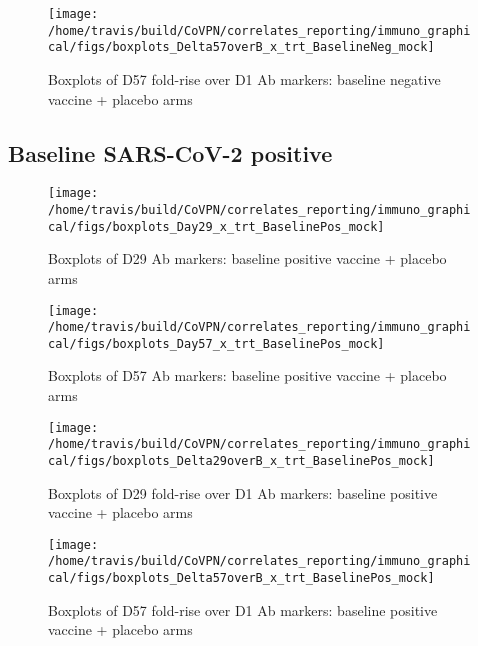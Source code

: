 \documentclass[]{book}
\theoremstyle{definition}
\theoremstyle{definition}
\theoremstyle{definition}
\newcommand{\1}{\mathbbm{1}}
\begin{document}
\begin{figure}[H]

{\centering \texttt{[image: /home/travis/build/CoVPN/correlates\_reporting/immuno\_graphical/figs/boxplots\_Delta57overB\_x\_trt\_BaselineNeg\_mock]} 

}

\caption{Boxplots of D57 fold-rise over D1 Ab markers: baseline negative vaccine + placebo arms}\label{fig:unnamed-chunk-40}
\end{figure}

\hypertarget{baseline-sars-cov-2-positive-2}{%
\subsection{Baseline SARS-CoV-2 positive}\label{baseline-sars-cov-2-positive-2}}

\begin{figure}[H]

{\centering \texttt{[image: /home/travis/build/CoVPN/correlates\_reporting/immuno\_graphical/figs/boxplots\_Day29\_x\_trt\_BaselinePos\_mock]} 

}

\caption{Boxplots of D29 Ab markers: baseline positive vaccine + placebo arms}\label{fig:unnamed-chunk-41}
\end{figure}

\begin{figure}[H]

{\centering \texttt{[image: /home/travis/build/CoVPN/correlates\_reporting/immuno\_graphical/figs/boxplots\_Day57\_x\_trt\_BaselinePos\_mock]} 

}

\caption{Boxplots of D57 Ab markers: baseline positive vaccine + placebo arms}\label{fig:unnamed-chunk-42}
\end{figure}

\begin{figure}[H]

{\centering \texttt{[image: /home/travis/build/CoVPN/correlates\_reporting/immuno\_graphical/figs/boxplots\_Delta29overB\_x\_trt\_BaselinePos\_mock]} 

}

\caption{Boxplots of D29 fold-rise over D1 Ab markers: baseline positive vaccine + placebo arms}\label{fig:unnamed-chunk-43}
\end{figure}

\begin{figure}[H]

{\centering \texttt{[image: /home/travis/build/CoVPN/correlates\_reporting/immuno\_graphical/figs/boxplots\_Delta57overB\_x\_trt\_BaselinePos\_mock]} 

}

\caption{Boxplots of D57 fold-rise over D1 Ab markers: baseline positive vaccine + placebo arms}\label{fig:unnamed-chunk-44}
\end{figure}
\end{document}
